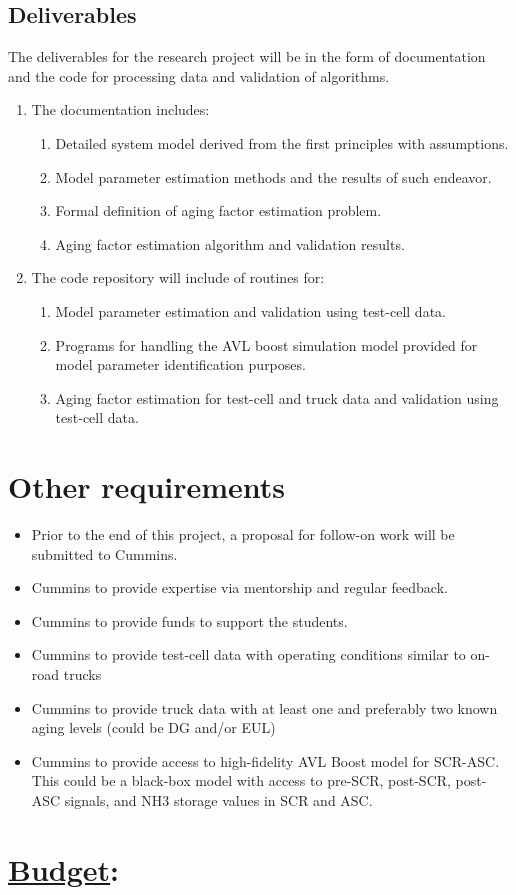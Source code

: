 \subsection{Deliverables}
The deliverables for the research project will be in the form of documentation
and the code for processing data and validation of algorithms.

\begin{enumerate}
    \item The documentation includes:
\begin{enumerate}
    \item Detailed system model derived from the first principles with assumptions.
    \item Model parameter estimation methods and the results of such endeavor.
    \item Formal definition of aging factor estimation problem.
    \item Aging factor estimation algorithm and validation results.
\end{enumerate}

\item The code repository will include of routines for:
\begin{enumerate}
    \item Model parameter estimation and validation using test-cell data.
\item Programs for handling the AVL boost simulation model provided for model
parameter identification purposes.
\item Aging factor estimation for test-cell and truck data and validation using
test-cell data.
\end{enumerate}

\end{enumerate}


\section{Other requirements}
\begin{itemize}
    \item Prior to the end of this project, a proposal for follow-on work will be submitted to Cummins.
    \item Cummins to provide expertise via mentorship and regular feedback.
    \item Cummins to provide funds to support the students.
    \item Cummins to provide test-cell data with operating conditions similar to on-road trucks
    \item Cummins to provide truck data with at least one and preferably two known aging levels (could be DG and/or EUL)
    \item Cummins to provide access to high-fidelity AVL Boost model for SCR-ASC. This could be a black-box model with access to pre-SCR, post-SCR, post-ASC signals, and NH3 storage values in SCR and ASC.
\end{itemize}

\section{\underline{Budget}:}
